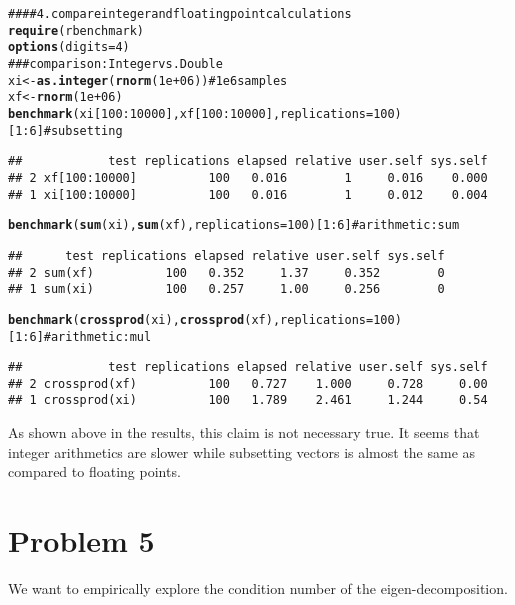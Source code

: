 \documentclass{article}\usepackage{graphicx, color}
\makeatletter
\newcommand{\hlfunctioncall}[1]{\textcolor[rgb]{0.501960784313725,0,0.329411764705882}{\textbf{#1}}}%
\newcommand{\hlcomment}[1]{\textcolor[rgb]{0.180392156862745,0.6,0.341176470588235}{#1}}%
\newenvironment{kframe}{%
 \def\at@end@of@kframe{}%
 \ifinner\ifhmode%
  \def\at@end@of@kframe{\end{minipage}}%
  \begin{minipage}{\columnwidth}%
 \fi\fi%
 \def\FrameCommand##1{\hskip\@totalleftmargin \hskip-\fboxsep
 \colorbox{shadecolor}{##1}\hskip-\fboxsep
     \hskip-\linewidth \hskip-\@totalleftmargin \hskip\columnwidth}%
 \MakeFramed {\advance\hsize-\width
   \@totalleftmargin\z@ \linewidth\hsize
   \@setminipage}}%
 {\par\unskip\endMakeFramed%
 \at@end@of@kframe}
\newenvironment{knitrout}{}{} %
\makeatother
\begin{document}
\begin{knitrout}
\color{fgcolor}\begin{kframe}
\begin{alltt}
\hlcomment{#### 4. compare integer and floating point calculations}
\hlfunctioncall{require}(rbenchmark)
\hlfunctioncall{options}(digits = 4)
\hlcomment{### comparison: Integer vs. Double}
xi <- \hlfunctioncall{as.integer}(\hlfunctioncall{rnorm}(1e+06))  \hlcomment{# 1e6 samples}
xf <- \hlfunctioncall{rnorm}(1e+06)
\hlfunctioncall{benchmark}(xi[100:10000], xf[100:10000], replications = 100)[1:6]  \hlcomment{#subsetting}
\end{alltt}
\begin{verbatim}
##            test replications elapsed relative user.self sys.self
## 2 xf[100:10000]          100   0.016        1     0.016    0.000
## 1 xi[100:10000]          100   0.016        1     0.012    0.004
\end{verbatim}
\begin{alltt}
\hlfunctioncall{benchmark}(\hlfunctioncall{sum}(xi), \hlfunctioncall{sum}(xf), replications = 100)[1:6]  \hlcomment{#arithmetic: sum}
\end{alltt}
\begin{verbatim}
##      test replications elapsed relative user.self sys.self
## 2 sum(xf)          100   0.352     1.37     0.352        0
## 1 sum(xi)          100   0.257     1.00     0.256        0
\end{verbatim}
\begin{alltt}
\hlfunctioncall{benchmark}(\hlfunctioncall{crossprod}(xi), \hlfunctioncall{crossprod}(xf), replications = 100)[1:6]  \hlcomment{#arithmetic: mul}
\end{alltt}
\begin{verbatim}
##            test replications elapsed relative user.self sys.self
## 2 crossprod(xf)          100   0.727    1.000     0.728     0.00
## 1 crossprod(xi)          100   1.789    2.461     1.244     0.54
\end{verbatim}
\end{kframe}
\end{knitrout}

As shown above in the results, this claim is not necessary true. It seems that 
integer arithmetics are slower while subsetting vectors is almost the same as compared to
floating points.

\newpage
\section*{Problem 5}
We want to empirically explore the condition number of the eigen-decomposition.
\end{document}
